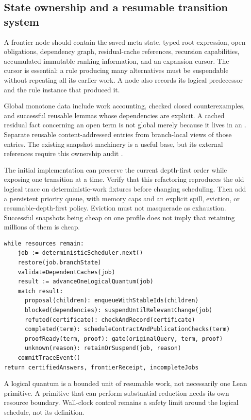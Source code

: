 \subsection{State ownership and a resumable transition system}

A frontier node should contain the saved meta state, typed root expression,
open obligations, dependency graph, residual-cache references, recursion
capabilities, accumulated immutable ranking information, and an expansion
cursor. The cursor is essential: a rule producing many alternatives must be
suspendable without repeating all its earlier work. A node also records its
logical predecessor and the rule instance that produced it.

Global monotone data include work accounting, checked closed counterexamples,
and successful reusable lemmas whose dependencies are explicit. A cached
residual fact concerning an open term is not global merely because it lives
in an . Separate reusable content-addressed entries from
branch-local views of those entries. The existing snapshot machinery is a
useful base, but its external references require this ownership audit
\cite{transactioncode,searchcode}.

The initial implementation can preserve the current depth-first order while
exposing one transition at a time. Verify that this refactoring reproduces the
old logical trace on deterministic-work fixtures before changing scheduling.
Then add a persistent priority queue, with memory caps and an explicit spill,
eviction, or resumable-depth-first policy. Eviction must not masquerade as
exhaustion. Successful snapshots being cheap on one profile does not imply
that retaining millions of them is cheap.

\begin{lstlisting}
while resources remain:
    job := deterministicScheduler.next()
    restore(job.branchState)
    validateDependentCaches(job)
    result := advanceOneLogicalQuantum(job)
    match result:
      proposal(children): enqueueWithStableIds(children)
      blocked(dependencies): suspendUntilRelevantChange(job)
      refuted(certificate): checkAndRecord(certificate)
      completed(term): scheduleContractAndPublicationChecks(term)
      proofReady(term, proof): gate(originalQuery, term, proof)
      unknown(reason): retainOrSuspend(job, reason)
    commitTraceEvent()
return certifiedAnswers, frontierReceipt, incompleteJobs
\end{lstlisting}
A logical quantum is a bounded unit of resumable work, not necessarily one
Lean primitive. A primitive that can perform substantial reduction needs its
own resource boundary. Wall-clock control remains a safety limit around the
logical schedule, not its definition.

